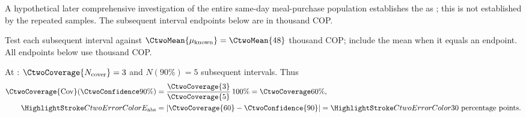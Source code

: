 \begin{probleminfoexcerpt}
A hypothetical later comprehensive investigation of the entire same-day meal-purchase population establishes the   as   ; this is not established by the repeated samples. The subsequent interval endpoints below are in thousand COP.
\end{probleminfoexcerpt}


Test each subsequent interval against $\CtwoMean{\mu_{\mathrm{known}}}=\CtwoMean{48}$ thousand COP; include the mean when it equals an endpoint. All endpoints below use thousand COP.



At : $\CtwoCoverage{N_{\mathrm{cover}}}=3$ and $N(90\%)=5$ subsequent intervals. Thus
\[\begin{aligned}
\CtwoCoverage{\mathrm{Cov}}(\CtwoConfidence{90\%})&=\frac{\CtwoCoverage{3}}{\CtwoCoverage{5}}\,100\%=\CtwoCoverage{60\%},\\
\CtwoError{E_{\mathrm{abs}}}&=|\CtwoCoverage{60}-\CtwoConfidence{90}|=\CtwoError{30}\text{ percentage points}.
\end{aligned}\]

